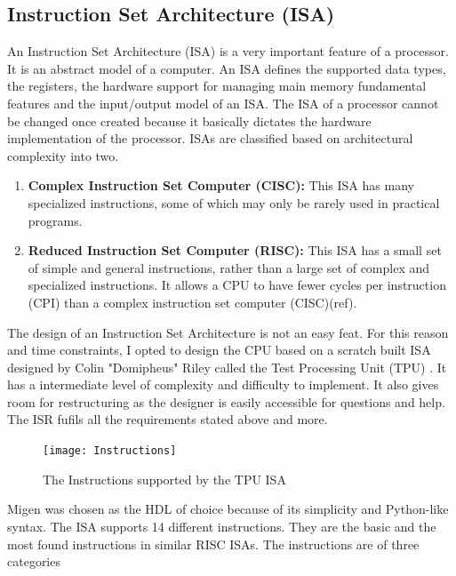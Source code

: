 \subsection{Instruction Set Architecture (ISA)}
An Instruction Set Architecture (ISA) is a very important feature of a processor. It is an abstract model of a computer. An ISA defines the supported data types, the registers, the hardware support for managing main memory fundamental features and the input/output model of an ISA. The ISA of a processor cannot be changed once created because it basically dictates the hardware implementation of the processor.
ISAs are classified based on architectural complexity into two.
\begin{enumerate}
\item \textbf{Complex Instruction Set Computer (CISC):} This ISA has many specialized instructions, some of which may only be rarely used in practical programs.
\item \textbf{Reduced Instruction Set Computer (RISC):} This ISA has a small set of simple and general instructions, rather than a large set of complex and specialized instructions. It allows a CPU to have fewer cycles per instruction (CPI) than a complex instruction set computer (CISC)(ref).
\end{enumerate}

The design of an Instruction Set Architecture is not an easy feat. For this reason and time constraints, I opted to design the CPU based on a scratch built ISA designed by Colin "Domipheus" Riley called the Test Processing Unit (TPU) \cite{tpu}. It has a intermediate level of complexity and difficulty to  implement. It also gives room for restructuring as the designer is easily accessible for questions and help. The ISR fufils all the requirements stated above and more.

\begin{figure}[p]
\texttt{[image: Instructions]}
\centering
\caption{The Instructions supported by the TPU ISA}
\centering
\label{fig:instr}

\end{figure}


Migen was chosen as the HDL of choice because of its simplicity and Python-like syntax. The ISA supports 14 different instructions. They are the basic and the most found instructions in similar RISC ISAs. The instructions are of three categories 

